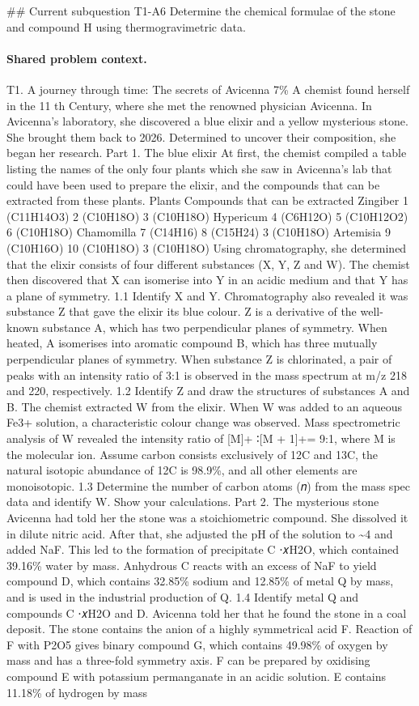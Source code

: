 \#\# Current subquestion T1-A6
Determine the chemical formulae of the stone and compound H using thermogravimetric data.

\paragraph{Shared problem context.}
T1. A journey through time: The secrets of Avicenna 7\% A chemist found herself in the 11 th Century, where she met the renowned physician Avicenna. In Avicenna's laboratory, she discovered a blue elixir and a yellow mysterious stone. She brought them back to 2026. Determined to uncover their composition, she began her research. Part 1. The blue elixir At first, the chemist compiled a table listing the names of the only four plants which she saw in Avicenna’s lab that could have been used to prepare the elixir, and the compounds that can be extracted from these plants. Plants Compounds that can be extracted Zingiber 1 (C11H14O3) 2 (C10H18O) 3 (C10H18O) Hypericum 4 (C6H12O) 5 (C10H12O2) 6 (C10H18O) Chamomilla 7 (C14H16) 8 (C15H24) 3 (C10H18O) Artemisia 9 (C10H16O) 10 (C10H18O) 3 (C10H18O) Using chromatography, she determined that the elixir consists of four different substances (X, Y, Z and W). The chemist then discovered that X can isomerise into Y in an acidic medium and that Y has a plane of symmetry. 1.1 Identify X and Y. Chromatography also revealed it was substance Z that gave the elixir its blue colour. Z is a derivative of the well-known substance A, which has two perpendicular planes of symmetry. When heated, A isomerises into aromatic compound B, which has three mutually perpendicular planes of symmetry. When substance Z is chlorinated, a pair of peaks with an intensity ratio of 3:1 is observed in the mass spectrum at m/z 218 and 220, respectively. 1.2 Identify Z and draw the structures of substances A and B. The chemist extracted W from the elixir. When W was added to an aqueous Fe3+ solution, a characteristic colour change was observed. Mass spectrometric analysis of W revealed the intensity ratio of [M]+ ∶[M + 1]+= 9:1, where M is the molecular ion. Assume carbon consists exclusively of 12C and 13C, the natural isotopic abundance of 12C is 98.9\%, and all other elements are monoisotopic. 1.3 Determine the number of carbon atoms (𝑛) from the mass spec data and identify W. Show your calculations. Part 2. The mysterious stone Avicenna had told her the stone was a stoichiometric compound. She dissolved it in dilute nitric acid. After that, she adjusted the pH of the solution to \textasciitilde{}4 and added NaF. This led to the formation of precipitate C ⋅𝑥H2O, which contained 39.16\% water by mass. Anhydrous C reacts with an excess of NaF to yield compound D, which contains 32.85\% sodium and 12.85\% of metal Q by mass, and is used in the industrial production of Q. 1.4 Identify metal Q and compounds C ⋅𝑥H2O and D. Avicenna told her that he found the stone in a coal deposit. The stone contains the anion of a highly symmetrical acid F. Reaction of F with P2O5 gives binary compound G, which contains 49.98\% of oxygen by mass and has a three-fold symmetry axis. F can be prepared by oxidising compound E with potassium permanganate in an acidic solution. E contains 11.18\% of hydrogen by mass 